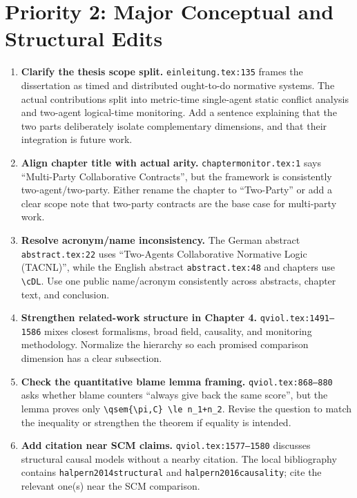 \documentclass[11pt,a4paper]{article}
\newcommand{\sev}[1]{\textbf{#1}}
\newcommand{\loc}[1]{\texttt{#1}}
\begin{document}
\section*{Priority 2: Major Conceptual and Structural Edits}

\begin{enumerate}
  \item \sev{Clarify the thesis scope split.} \loc{einleitung.tex:135} frames the
  dissertation as timed and distributed ought-to-do normative systems. The actual
  contributions split into metric-time single-agent static conflict analysis and
  two-agent logical-time monitoring. Add a sentence explaining that the two parts
  deliberately isolate complementary dimensions, and that their integration is
  future work.

  \item \sev{Align chapter title with actual arity.} \loc{chaptermonitor.tex:1}
  says ``Multi-Party Collaborative Contracts'', but the framework is consistently
  two-agent/two-party. Either rename the chapter to ``Two-Party'' or add a clear
  scope note that two-party contracts are the base case for multi-party work.

  \item \sev{Resolve acronym/name inconsistency.} The German abstract
  \loc{abstract.tex:22} uses ``Two-Agents Collaborative Normative Logic (TACNL)'',
  while the English abstract \loc{abstract.tex:48} and chapters use \verb|\cDL|.
  Use one public name/acronym consistently across abstracts, chapter text, and
  conclusion.

  \item \sev{Strengthen related-work structure in Chapter 4.}
  \loc{qviol.tex:1491--1586} mixes closest formalisms, broad field, causality, and
  monitoring methodology. Normalize the hierarchy so each promised comparison
  dimension has a clear subsection.

  \item \sev{Check the quantitative blame lemma framing.} \loc{qviol.tex:868--880}
  asks whether blame counters ``always give back the same score'', but the lemma
  proves only \verb|\qsem{\pi,C} \le n_1+n_2|. Revise the question to match the
  inequality or strengthen the theorem if equality is intended.

  \item \sev{Add citation near SCM claims.} \loc{qviol.tex:1577--1580} discusses
  structural causal models without a nearby citation. The local bibliography
  contains \loc{halpern2014structural} and \loc{halpern2016causality}; cite the
  relevant one(s) near the SCM comparison.
\end{enumerate}
\end{document}
